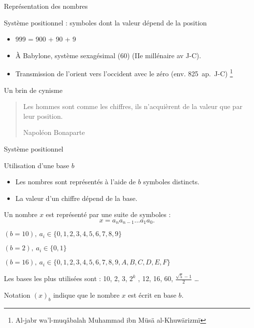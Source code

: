 \begin{frame}{Représentation des nombres}                                                                                                                
  \begin{alertblock}{Système positionnel : symboles dont la valeur dépend de la position}
    \begin{itemize}
    \item 999 = 900 + 90 + 9
    \item À Babylone, système sexagésimal (60) (IIe millénaire av J-C).
    \item Transmission de l'orient vers l'occident avec le zéro (env. 825~ap.~J-C)
      \footnote{\og Al-jabr wa’l-muqâbalah \fg  Muhammad ibn Müsä al-Khuwärizmï}
    \end{itemize}
  \end{alertblock}

  \begin{block}{Un brin de cynisme}
    \begin{quote}
      Les hommes sont comme les chiffres, ils n'acquièrent de la valeur que par leur position.
      \begin{flushright}
        Napoléon Bonaparte 
      \end{flushright}
    \end{quote}
  \end{block}
\end{frame}


\begin{frame}{Système positionnel}
  \begin{block}{Utilisation d'une base $b$}
  \begin{itemize}
  \item Les nombres sont représentés à l’aide de $b$ symboles distincts.
  \item La valeur d’un chiffre dépend de la base.
  \end{itemize}
  \end{block}

  \begin{alertblock}{Un nombre $x$ est représenté par une suite de symboles :}
    \alert{
      \[
        x = a_n a_{n-1} \ldots a_1 a_0 .
      \]
    }
  \end{alertblock}

    \begin{description}[Hexadécimale] 
  \item[Décimale] $(b = 10),\ a_i \in \{0, 1, 2, 3, 4, 5, 6, 7, 8, 9\}$
  \item[Binaire] $(b = 2),\ a_i \in \{0, 1\}$
  \item[Hexadécimale] $(b = 16),\ a_i \in \{0, 1, 2, 3, 4, 5, 6, 7, 8, 9, A, B, C, D, E, F\}$
  \end{description}
  Les bases les plus utilisées sont : 10, 2, 3, $2^k$ , 12, 16, 60, $\frac{\sqrt{5}- 1}{2}$ \dots \\
  \begin{block}{Notation}
    $(x)_b$ indique que le nombre $x$ est écrit en base $b$.
  \end{block}

\end{frame}


